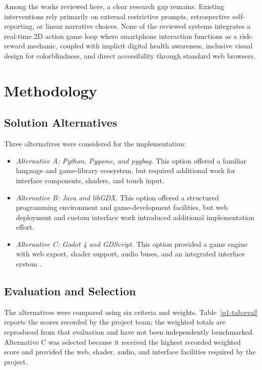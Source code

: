 \documentclass[conference]{IEEEtran}
\begin{document}
Among the works reviewed here, a clear research gap remains.
Existing interventions rely primarily on external restrictive prompts, retrospective self-reporting, or linear narrative choices.
None of the reviewed systems integrates a real-time 2D action game loop where smartphone interaction functions as a risk-reward mechanic, coupled with implicit digital health awareness, inclusive visual design for colorblindness, and direct accessibility through standard web browsers.

\section{Methodology}
\label{p1-sec:method}

\subsection{Solution Alternatives}
Three alternatives were considered for the implementation:
\begin{itemize}
\item \textit{Alternative A: Python, Pygame, and pygbag.} This option offered a familiar language and game-library ecosystem, but required additional work for interface components, shaders, and touch input.
\item \textit{Alternative B: Java and libGDX.} This option offered a structured programming environment and game-development facilities, but web deployment and custom interface work introduced additional implementation effort.
\item \textit{Alternative C: Godot 4 and GDScript.} This option provided a game engine with web export, shader support, audio buses, and an integrated interface system \cite{godotdocs}.
\end{itemize}

\subsection{Evaluation and Selection}
The alternatives were compared using six criteria and weights. Table~\ref{p1-tab:eval} reports the scores recorded by the project team; the weighted totals are reproduced from that evaluation and have not been independently benchmarked. Alternative C was selected because it received the highest recorded weighted score and provided the web, shader, audio, and interface facilities required by the project.
\end{document}
